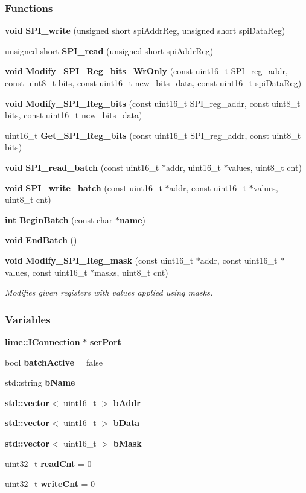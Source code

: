 \subsubsection*{Functions}
\begin{DoxyCompactItemize}
\item 
{\bf void} {\bf S\+P\+I\+\_\+write} (unsigned short spi\+Addr\+Reg, unsigned short spi\+Data\+Reg)
\item 
unsigned short {\bf S\+P\+I\+\_\+read} (unsigned short spi\+Addr\+Reg)
\item 
{\bf void} {\bf Modify\+\_\+\+S\+P\+I\+\_\+\+Reg\+\_\+bits\+\_\+\+Wr\+Only} (const uint16\+\_\+t S\+P\+I\+\_\+reg\+\_\+addr, const uint8\+\_\+t bits, const uint16\+\_\+t new\+\_\+bits\+\_\+data, const uint16\+\_\+t spi\+Data\+Reg)
\item 
{\bf void} {\bf Modify\+\_\+\+S\+P\+I\+\_\+\+Reg\+\_\+bits} (const uint16\+\_\+t S\+P\+I\+\_\+reg\+\_\+addr, const uint8\+\_\+t bits, const uint16\+\_\+t new\+\_\+bits\+\_\+data)
\item 
uint16\+\_\+t {\bf Get\+\_\+\+S\+P\+I\+\_\+\+Reg\+\_\+bits} (const uint16\+\_\+t S\+P\+I\+\_\+reg\+\_\+addr, const uint8\+\_\+t bits)
\item 
{\bf void} {\bf S\+P\+I\+\_\+read\+\_\+batch} (const uint16\+\_\+t $\ast$addr, uint16\+\_\+t $\ast$values, uint8\+\_\+t cnt)
\item 
{\bf void} {\bf S\+P\+I\+\_\+write\+\_\+batch} (const uint16\+\_\+t $\ast$addr, const uint16\+\_\+t $\ast$values, uint8\+\_\+t cnt)
\item 
{\bf int} {\bf Begin\+Batch} (const char $\ast${\bf name})
\item 
{\bf void} {\bf End\+Batch} ()
\item 
{\bf void} {\bf Modify\+\_\+\+S\+P\+I\+\_\+\+Reg\+\_\+mask} (const uint16\+\_\+t $\ast$addr, const uint16\+\_\+t $\ast$values, const uint16\+\_\+t $\ast$masks, uint8\+\_\+t cnt)
\begin{DoxyCompactList}\small\item\em Modifies given registers with values applied using masks. \end{DoxyCompactList}\end{DoxyCompactItemize}
\subsubsection*{Variables}
\begin{DoxyCompactItemize}
\item 
{\bf lime\+::\+I\+Connection} $\ast$ {\bf ser\+Port}
\item 
bool {\bf batch\+Active} = false
\item 
std\+::string {\bf b\+Name}
\item 
{\bf std\+::vector}$<$ uint16\+\_\+t $>$ {\bf b\+Addr}
\item 
{\bf std\+::vector}$<$ uint16\+\_\+t $>$ {\bf b\+Data}
\item 
{\bf std\+::vector}$<$ uint16\+\_\+t $>$ {\bf b\+Mask}
\item 
uint32\+\_\+t {\bf read\+Cnt} = 0
\item 
uint32\+\_\+t {\bf write\+Cnt} = 0
\end{DoxyCompactItemize}


